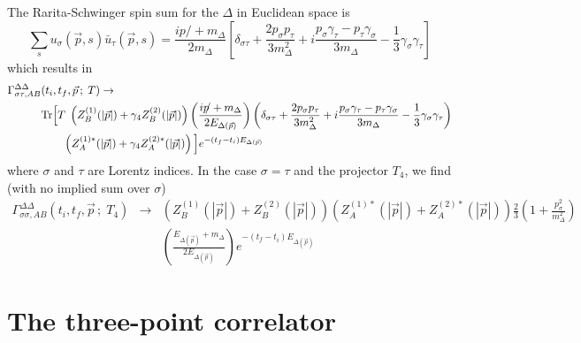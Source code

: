 \documentclass[12pt]{article}
\begin{document}
The Rarita-Schwinger spin sum for the $\Delta$ in Euclidean space is 
\[
\sum_su_\sigma(\vec{p},s)\bar{u}_\tau(\vec{p},s) = \frac{ip\!\!/+m_\Delta}
  {2m_\Delta}
\left[\delta_{\sigma\tau}+\frac{2p_\sigma p_\tau}{3m_\Delta^2} +
  i\frac{p_\sigma \gamma_\tau - p_\tau \gamma_\sigma}{3m_\Delta} - 
  \frac{1}{3}\gamma_\sigma \gamma_\tau \right]
\]
which results in
\[
\begin{split}
\Gamma^{\Delta\Delta}_{\sigma\tau,AB}&(t_i,t_f,\vec{p}\,;\;T) \to \\
&{\rm Tr}
\Big[T\;\left(Z_B^{(1)}(|\vec{p}|)+\gamma_4Z_B^{(2)}(|\vec{p}|)\right)
\left(\frac{ip\!\!/+m_\Delta}{2E_{\Delta(\vec p)}}\right)
\left(\delta_{\sigma\tau}+\frac{2p_\sigma p_\tau}{3m_\Delta^2} +
  i\frac{p_\sigma \gamma_\tau - p_\tau \gamma_\sigma}{3m_\Delta} - 
  \frac{1}{3}\gamma_\sigma \gamma_\tau \right) \\
& \qquad\left(Z_A^{(1)*}(|\vec{p}|)+\gamma_4Z_A^{(2)*}(|\vec{p}|)\right)
\Big] e^{-(t_f-t_i)E_{\Delta(\vec{p})}}
\end{split}
\]
where $\sigma$ and $\tau$ are Lorentz indices.
In the case $\sigma=\tau$ and the projector $T_4$, we find
(with no implied sum over $\sigma$)
\begin{eqnarray}
\Gamma^{\Delta\Delta}_{\sigma\sigma,AB}(t_i,t_f,\vec{p}\,;\;T_4) &\to&
\left(Z_B^{(1)}(|\vec{p}|)+Z_B^{(2)}(|\vec{p}|)\right)
\left(Z_A^{(1)*}(|\vec{p}|)+Z_A^{(2)*}(|\vec{p}|)\right)
\frac{2}{3}\left(1+\frac{p_\sigma^2}{m_\Delta^2}\right) \nonumber \\
&& \left(\frac{E_{\Delta(\vec{p})}+m_\Delta}{2E_{\Delta(\vec p)}}\right)
e^{-(t_f-t_i)E_{\Delta(\vec{p})}}
\end{eqnarray}


\section{The three-point correlator}
\end{document}
